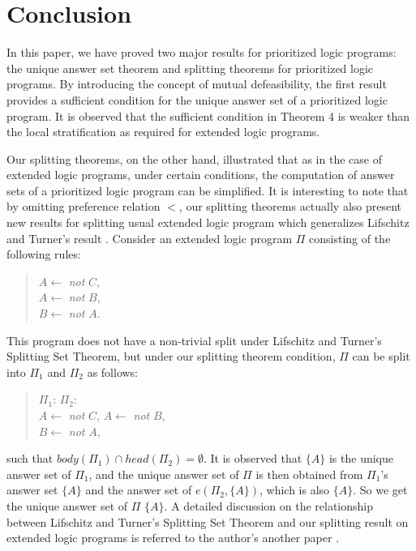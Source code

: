 \documentclass{tlp}
\begin{document}
\section{Conclusion}

In this paper, we have proved two major results for 
prioritized logic programs:
the unique answer set theorem and
splitting theorems for prioritized logic programs.
By introducing the concept of mutual defeasibility,
the first result provides a sufficient condition for the unique answer 
set of a prioritized logic program. It is observed that the sufficient condition
in Theorem 4 is weaker than the local stratification as required for
extended logic programs.

Our splitting theorems, on the other hand, 
illustrated that as in the case of extended logic programs, under  
certain
conditions, the computation of answer sets of a prioritized logic 
program can be simplified.
It is interesting to note that by omitting preference relation $<$,
our splitting theorems actually also present new results for splitting usual 
extended logic program which 
generalizes Lifschitz and Turner's result \cite{lt:lp94}. Consider
an extended logic program $\Pi$ consisting of the following rules:
\begin{quote}
$A\leftarrow$ {\em not} $C$,\\     
\hspace*{.1in} $A\leftarrow$ {\em not} $B$,\\
\hspace*{.1in} $B\leftarrow$ {\em not} $A$. 
\end{quote}        
This program does not have a non-trivial split under
Lifschitz and Turner's Splitting Set Theorem,
but under our splitting theorem condition, $\Pi$ can 
be split into $\Pi_{1}$ and $\Pi_{2}$ as follows:
\begin{quote}                      
$\Pi_{1}$: \hspace*{1.2in} $\Pi_{2}$:\\
\hspace*{.1in} $A\leftarrow$ {\em not} $C$,
\hspace*{.7in} $A\leftarrow$ {\em not} $B$,\\
\hspace*{1.55in} $B\leftarrow$ {\em not} $A$,
\end{quote}                        
such that $body(\Pi_{1})\cap head(\Pi_{2})=\emptyset$. It is observed that
$\{A\}$ is the unique answer set of $\Pi_{1}$, and
the unique answer set of $\Pi$ is then obtained from
$\Pi_{1}$'s answer set $\{A\}$ and the answer set of
$e(\Pi_{2},\{A\})$, which is also $\{A\}$. So we get the unique answer set
of $\Pi$ $\{A\}$.   A detailed discussion on the relationship between 
Lifschitz and Turner's Splitting Set Theorem and our splitting result on 
extended  logic programs 
is referred to the author's another paper \cite{yan:iclp99}. 
\end{document}
